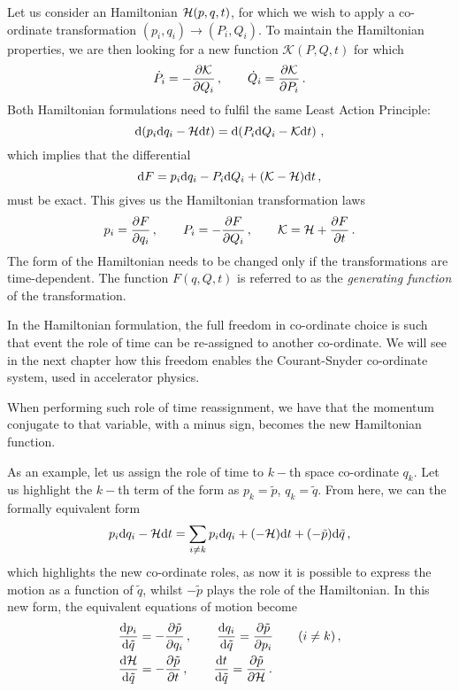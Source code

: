 Let us consider an Hamiltonian $\mathcal{H}(p,q,t)$, for which we wish to apply a co-ordinate transformation $(p_i,q_i)\to(P_i,Q_i)$. To maintain the Hamiltonian properties, we are then looking for a new function $\mathcal{K}(P,Q,t)$ for which
%
\begin{equation}
    \dot P_i = -\pdv{\mathcal{K}}{Q_i}\,, \qquad \dot Q_i = \pdv{\mathcal{K}}{P_i}\,.
\end{equation}
%
Both Hamiltonian formulations need to fulfil the same Least Action Principle:
%
\begin{equation}
    \dd (p_i \dd q_i- \mathcal{H} \dd t) = \dd(P_i \dd Q_i - \mathcal{K}\dd t)\,,
\end{equation}
%
which implies that the differential
%
\begin{equation}
    \dd F = p_i\dd q_i - P_i \dd Q_i + (\mathcal{K}-\mathcal{H})\dd t\, ,
\end{equation}
%
must be exact. This gives us the Hamiltonian transformation laws
%
\begin{equation} 
	p_i = \pdv{F}{q_i}\,, \qquad P_i = -\pdv{F}{Q_i}\,, \qquad \mathcal{K}=\mathcal{H}+\pdv{F}{t}\,.
\end{equation}
%
The form of the Hamiltonian needs to be changed only if the transformations are time-dependent. The function $F(q,Q,t)$ is referred to as the \textit{generating function} of the transformation.

In the Hamiltonian formulation, the full freedom in co-ordinate choice is such that event the role of time can be re-assigned to another co-ordinate. We will see in the next chapter how this freedom enables the Courant-Snyder co-ordinate system, used in accelerator physics.

When performing such role of time reassignment, we have that the momentum conjugate to that variable, with a minus sign, becomes the new Hamiltonian function.

As an example, let us assign the role of time to $k-$th space co-ordinate $q_k$. Let us highlight the $k-$th term of the form as $p_k = \tilde p$, $q_k=\tilde q$. From here, we can the formally equivalent form
%
\begin{equation}
    p_i \dd q_i - \mathcal{H} \dd t = \sum_{i\neq k} p_i \dd q_i + (-\mathcal{H})\dd t + (-\tilde p)\dd\tilde q\,,
\end{equation}
%
which highlights the new co-ordinate roles, as now it is possible to express the motion as a function of $\tilde q$, whilst $-\tilde p$ plays the role of the Hamiltonian. In this new form, the equivalent equations of motion become
%
\begin{equation} 
\begin{split}
	&\dv{p_i}{\tilde q} = -\pdv{\tilde p}{q_i}\,, \qquad \dv{q_i}{\tilde q} = \pdv{\tilde p}{p_i} \qquad (i\neq k)\,, \\
	&\dv{\mathcal{H}}{\tilde q} = -\pdv{\tilde p}{t}\,,  \qquad \dv{t}{\tilde q} = \pdv{\tilde p}{\mathcal{H}}\,. 
\end{split}
\end{equation}

